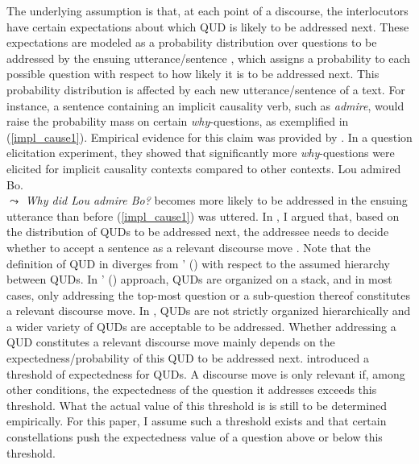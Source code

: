 \documentclass[output=paper,colorlinks,citecolor=brown]{langscibook}
\begin{document}
The underlying assumption is that, at each point of a discourse, the interlocutors have certain expectations about which QUD is likely to be addressed next. These expectations are modeled as a probability distribution over questions to be addressed by the ensuing utterance/sentence \citep[following][]{kehler_rohde_2017}, which assigns a probability to each possible question with respect to how likely it is to be addressed next. This probability distribution is affected by each new utterance/sentence of a text. For instance, a sentence containing an implicit causality verb, such as \textit{admire}, would raise the probability mass on certain \textit{why}-questions, as exemplified in (\ref{impl_cause1}). Empirical evidence for this claim was provided by \citet{westera_rohde_2019}. In a question elicitation experiment, they showed that significantly more \textit{why}-questions were elicited for implicit causality contexts compared to other contexts.
\ea\label{impl_cause1}Lou admired Bo.\\
$\leadsto$ \textit{Why did Lou admire Bo?} becomes more likely to be addressed in the ensuing utterance than before (\ref{impl_cause1}) was uttered.
\z
In \citet{tonnis_2021}, I argued that, based on the distribution of QUDs to be addressed next, the addressee needs to decide whether to accept a sentence as a relevant discourse move \citep[as described by][]{roberts_2012}. Note that the definition of QUD in \citet{tonnis_2021} diverges from \citeauthor{roberts_2012}' (\citeyear{roberts_2012}) with respect to the assumed hierarchy between QUDs. In \citeauthor{roberts_2012}' (\citeyear{roberts_2012}) approach, QUDs are organized on a stack, and in most cases, only addressing the top-most question or a sub-question thereof constitutes a relevant discourse move. In \citet{tonnis_2021}, QUDs are not strictly organized hierarchically and a wider variety of QUDs are acceptable to be addressed. Whether addressing a QUD constitutes a relevant discourse move mainly depends on the expectedness/probability of this QUD to be addressed next. \citet[][286]{tonnis_2021} introduced a threshold of expectedness for QUDs. A discourse move is only relevant if, among other conditions, the expectedness of the question it addresses exceeds this threshold. What the actual value of this threshold is is still to be determined empirically. For this paper, I assume such a threshold exists and that certain constellations push the expectedness value of a question above or below this threshold.\largerpage
\end{document}
